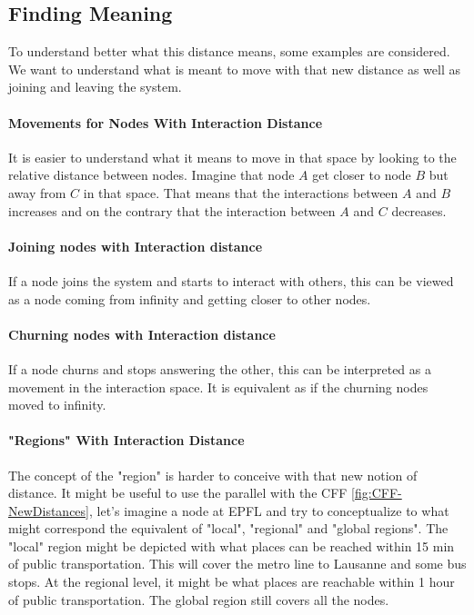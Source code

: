 \documentclass[a4paper,11pt,oneside]{report}
\begin{document}
\subsection{Finding Meaning}
To understand better what this distance means, some examples are
considered. We want to understand what is meant to move with that new distance as
well as joining and leaving the system. 

\paragraph{Movements for Nodes With Interaction Distance}
It is easier to understand what it means to move in that space by looking to
the relative distance between nodes. Imagine that node $A$ get closer to node
$B$ but away from $C$ in that space. That means that the interactions between
$A$ and $B$ increases and on the contrary that the interaction between $A$ and
$C$ decreases.

\paragraph{Joining nodes with Interaction distance}
If a node joins the system and starts to interact with others, this can be
viewed as a node coming from infinity and getting closer to other
nodes.

\paragraph{Churning nodes with Interaction distance}
If a node churns and stops answering the other, this can be interpreted as a
movement in the interaction space. It is equivalent as if the churning nodes moved
to infinity.  

\paragraph{"Regions" With Interaction Distance} \label{par:section-example}
The concept of the "region" is harder to conceive with that new notion of
distance. It might be useful to use the parallel with the CFF
\autoref{fig:CFF-NewDistances}, let's imagine a node at EPFL and try to
conceptualize to what might correspond the equivalent of "local", "regional"
and "global regions". The "local" region might be depicted with what places can
be reached within 15 min of public transportation. This will cover the metro
line to Lausanne and some bus stops. At the regional level, it might be what
places are reachable within 1 hour of public transportation. The global region still
covers all the nodes.
\end{document}
